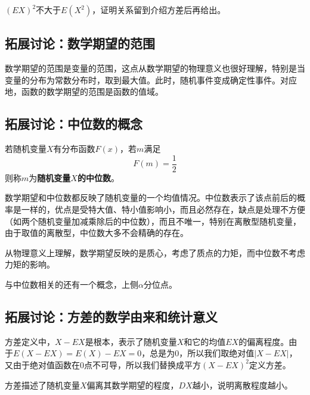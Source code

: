 \begin{tcolorbox}
$\left( EX \right) ^2$不大于$E\left( X^2 \right) $，证明关系留到介绍方差后再给出。
\end{tcolorbox}

\subsection{拓展讨论：数学期望的范围}

数学期望的范围是变量的范围，这点从数学期望的物理意义也很好理解，特别是当变量的分布为常数分布时，取到最大值。此时，随机事件变成确定性事件。对应地，函数的数学期望的范围是函数的值域。

\subsection{拓展讨论：中位数的概念}

\begin{definition}[中位数]
若随机变量$X$有分布函数$F\left( x \right) $，若$m$满足
\[
F\left( m \right) =\frac{1}{2}
\]
则称$m$为{\bf 随机变量$X$的中位数}。
\end{definition}

数学期望和中位数都反映了随机变量的一个均值情况。中位数表示了该点前后的概率是一样的，优点是受特大值、特小值影响小，而且必然存在，缺点是处理不方便（如两个随机变量加减乘除后的中位数），而且不唯一，特别在离散型随机变量，由于取值的离散型，中位数大多不会精确的存在。

从物理意义上理解，数学期望反映的是质心，考虑了质点的力矩，而中位数不考虑力矩的影响。

与中位数相关的还有一个概念，上侧$\alpha $分位点。

\subsection{拓展讨论：方差的数学由来和统计意义}

方差定义中，$X-EX$是根本，表示了随机变量$X$和它的均值$EX$的偏离程度。由于$E\left( X-EX \right) =E\left( X \right) -EX=0$，总是为0，所以我们取绝对值$\left| X-EX \right|$，又由于绝对值函数在0点不可导，所以我们替换成平方$\left( X-EX \right) ^2$定义方差。

方差描述了随机变量$X$偏离其数学期望的程度，$DX$越小，说明离散程度越小。

